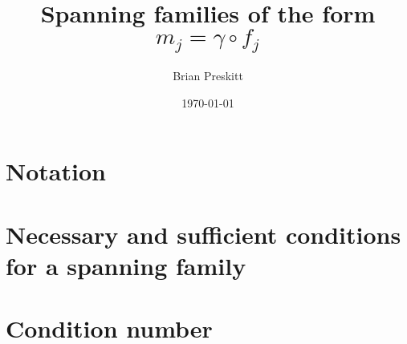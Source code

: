 

\title{Spanning families of the form $m_j = \gamma \circ f_j$}
\author{Brian Preskitt}
\date{\today}

\maketitle
\section{Notation}

\section{Necessary and sufficient conditions for a spanning family}

\section{Condition number}


